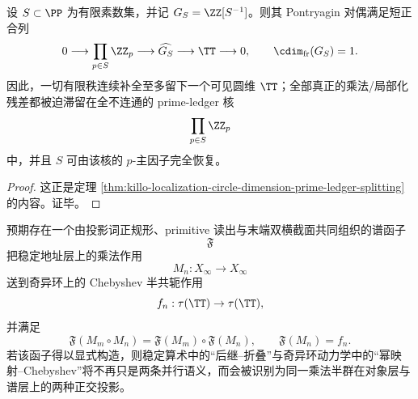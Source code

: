 \begin{corollary}\label{cor:conclusion-finite-rank-completion-single-circle-prime-ledger}
设 \(S\subset\PP\) 为有限素数集，并记 \(G_S=\ZZ[S^{-1}]\)。则其 Pontryagin 对偶满足短正合列
\[
0\longrightarrow \prod_{p\in S}\ZZ_p
\longrightarrow \widehat{G_S}
\longrightarrow \TT
\longrightarrow 0,
\qquad
\cdim_{\mathrm{fr}}(G_S)=1.
\]
因此，一切有限秩连续补全至多留下一个可见圆维 \(\TT\)；全部真正的乘法/局部化残差都被迫滞留在全不连通的 prime-ledger 核
\[
\prod_{p\in S}\ZZ_p
\]
中，并且 \(S\) 可由该核的 \(p\)-主因子完全恢复。
\end{corollary}
\begin{proof}
这正是定理 \ref{thm:killo-localization-circle-dimension-prime-ledger-splitting} 的内容。证毕。
\end{proof}

\begin{conjecture}[稳定乘法作用到奇异射线动力学的谱函子]\label{conj:conclusion-stable-successor-singular-ring-spectral-functor}
预期存在一个由投影词正规形、primitive 读出与末端双横截面共同组织的谱函子
\[
\mathfrak F
\]
把稳定地址层上的乘法作用
\[
M_n:X_\infty\to X_\infty
\]
送到奇异环上的 Chebyshev 半共轭作用
\[
f_n:\tau(\TT)\to \tau(\TT),
\]
并满足
\[
\mathfrak F(M_m\circ M_n)=\mathfrak F(M_m)\circ \mathfrak F(M_n),
\qquad
\mathfrak F(M_n)=f_n.
\]
若该函子得以显式构造，则稳定算术中的“后继--折叠”与奇异环动力学中的“幂映射--Chebyshev”将不再只是两条并行语义，而会被识别为同一乘法半群在对象层与谱层上的两种正交投影。
\end{conjecture}

